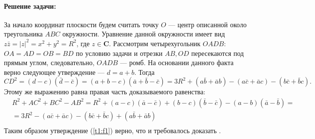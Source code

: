 {   \paragraph{Решение задачи:}
   За начало координат плоскости будем считать точку \(O\) --- центр описанной около треугольника \(ABC\)
   окружности. Уравнение данной окружности имеет вид \(z\bar{z} = |z|^2 = x^2 + y^2 = R^2\), где
   \(z \in \mathbf{C}\).
   Рассмотрим четырехугольник \(OADB\): \(OA = AD = OB = BD\)
   по условию задачи и отрезки \(AB, OD\) пересекаются под
   прямым углом, следовательно, \(OADB\) --- ромб. На основании
   данного факта верно следующее утверждение --- \(d = a + b\).
   Тогда
   \begin{equation}
      CD^2 =(d - c)(\bar{d} - \bar{c}) = (a + b - c)(\bar{a} +
      \bar{b} - \bar{c}) = 3R^2 + (a\bar{b} + \bar{a}b) - (a\bar{c} +
      \bar{a}c) - (b\bar{c} + \bar{b}c).
   \end{equation}
   Этому же выражению равна правая часть доказываемого
   равенства:
   \begin{equation}
      {
         \begin{aligned}
             & R^2 + AC^2 + BC^2 - AB^2 = R^2 + (a - c)(\bar{a} - \bar{c}) +
            (b - c)(\bar{b} - \bar{c}) - (a - b)(\bar{a} - \bar{b}) =        \\
             & = 3R^2 - (a\bar{c} + \bar{a}c) - (b\bar{c} + \bar{b}c) +
            (a\bar{b} + \bar{a}b)                                            \\
         \end{aligned}
      }
   \end{equation}
   Таким образом утверждение (\ref{t1:f1}) верно, что и требовалось доказать \cite[с. 13]{book:ponarin}.

}

